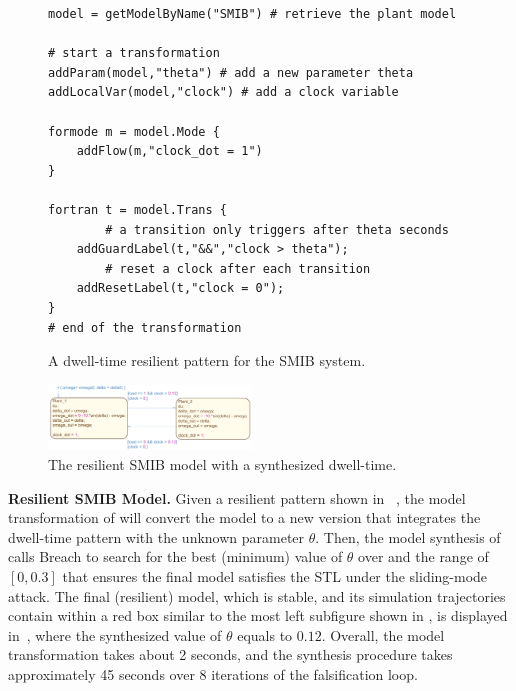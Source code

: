 \begin{figure}[!t]%
\begin{lstlisting}[basicstyle=\ttfamily\footnotesize, numbers=none]
model = getModelByName("SMIB") # retrieve the plant model
	
# start a transformation  
addParam(model,"theta") # add a new parameter theta
addLocalVar(model,"clock") # add a clock variable
	
formode m = model.Mode {
    addFlow(m,"clock_dot = 1")
}

fortran t = model.Trans {
		# a transition only triggers after theta seconds
    addGuardLabel(t,"&&","clock > theta"); 
		# reset a clock after each transition
    addResetLabel(t,"clock = 0"); 
}
# end of the transformation
\end{lstlisting}
\caption{A dwell-time resilient pattern for the SMIB system.}%
%
\end{figure}


\begin{figure}[t!]%
	\centering%
    \includegraphics[width=0.48\textwidth]{image/smib_plant_model_res}%
	\caption{The resilient SMIB model with a synthesized dwell-time.}%
\end{figure}%

\vspace{0.5em}
\noindent
{\bf Resilient SMIB Model.} Given a resilient pattern shown in ~, the model transformation of \toolreaffirm will convert the model to a new version that integrates the dwell-time pattern with the unknown parameter $\theta$.
%
Then, the model synthesis of \toolreaffirm calls Breach to search for the best (\ie minimum) value of $\theta$ over and the range of $[0, 0.3]$ that ensures the final model satisfies the STL  under the sliding-mode attack. The final (resilient) model, which is stable, and its simulation trajectories contain within a red box similar to the most left subfigure shown in , is displayed in~, where the synthesized value of $\theta$ equals to $0.12$. Overall, the model transformation takes about 2 seconds, and the synthesis procedure takes approximately 45 seconds over 8 iterations of the falsification loop.


